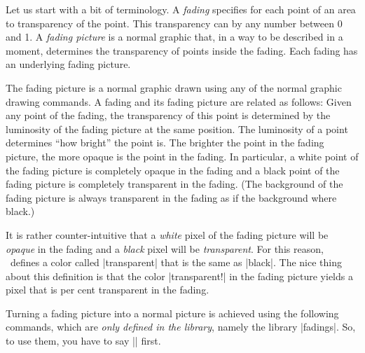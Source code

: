 Let us start with a bit of terminology. A \emph{fading} specifies for
each point of an area to transparency of the point. This transparency
can by any number between 0 and 1. A \emph{fading picture} is a normal
graphic that, in a way to be described in a moment, determines the
transparency of points inside the fading. Each fading has an
underlying fading picture.

The fading picture is a normal graphic drawn using any of the normal
graphic drawing commands. A fading and its fading picture are related
as follows: Given any point of the fading, the transparency of this
point is determined by the luminosity of the fading picture at the
same position. The luminosity of a point determines ``how bright'' the
point is. The brighter the point in the fading picture, the more
opaque is the point in the fading. In particular, a white point of the
fading picture is completely opaque in the fading and a black point of
the fading picture is completely transparent in the fading. (The
background of the fading picture is always transparent in the fading
as if the background where black.)

It is rather counter-intuitive that a \emph{white} pixel of the fading
picture will be \emph{opaque} in the fading and a \emph{black} pixel
will be \emph{transparent}. For this reason, \tikzname\ defines a
color called |transparent| that is the same as |black|. The nice thing
about this definition is that the color
|transparent!| in the fading picture yields a
pixel that is  per cent transparent in the fading.

Turning a fading picture into a normal picture is achieved using the
following commands, which are \emph{only defined in the library},
namely the library |fadings|. So, to use them, you have to say
|\usetikzlibrary{fadings}| first.

